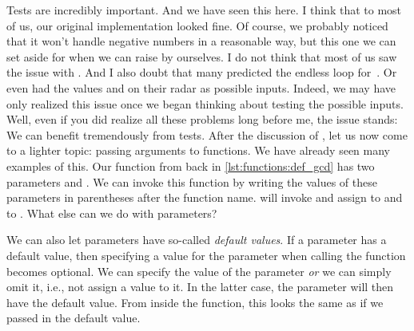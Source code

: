 Tests are incredibly important.
And we have seen this here.
I think that to most of us, our original  implementation looked fine.
Of course, we probably noticed that it won't handle negative numbers in a reasonable way, but this one we can set aside for when we can raise  by ourselves.
I do not think that most of us saw the issue with .
And I also doubt that many predicted the endless loop for~.
Or even had the values  and  on their radar as possible inputs.
Indeed, we may have only realized this issue once we began thinking about testing the possible inputs.
Well, even if you did realize all these problems long before me, the issue stands:
We can benefit tremendously from tests.%
%
\FloatBarrier%
\endhsection%
%
%
\FloatBarrier%
%
%
%
%
%
%
%
After the discussion of , let us now come to a lighter topic: passing arguments to functions.
We have already seen many examples of this.
Our  function from back in \cref{lst:functions:def_gcd} has two parameters  and .
We can invoke this function by writing the values of these parameters in parentheses after the function name.
 will invoke  and assign  to  and  to .
What else can we do with parameters?

We can also let parameters have so-called \emph{default values}.
If a parameter has a default value, then specifying a value for the parameter when calling the function becomes optional.
We can specify the value of the parameter \emph{or} we can simply omit it, i.e., not assign a value to it.
In the latter case, the parameter will then have the default value.
From inside the function, this looks the same as if we passed in the default value.

